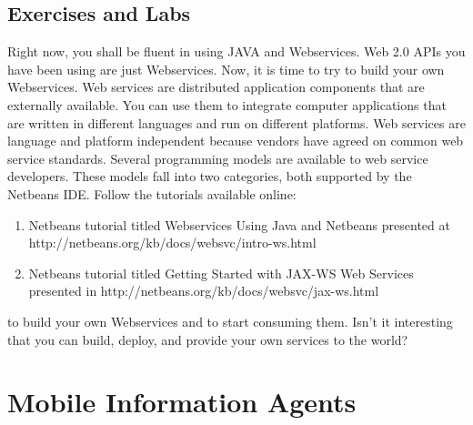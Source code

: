 \documentclass[12pt,a4paper,final,twoside,onecolumn,titlepage]{book}
\begin{document}
\section{Exercises and Labs}
Right now, you shall be fluent in using JAVA and Webservices. Web 2.0 APIs you have been using are just Webservices. Now, it is time to try to build your own Webservices. Web services are distributed application components that are externally available. You can use them to integrate computer applications that are written in different languages and run on different platforms. Web services are language and platform independent because vendors have agreed on common web service standards.
Several programming models are available to web service developers. These models fall into two categories, both supported by the Netbeans IDE. Follow the tutorials available online:
\begin{enumerate}
\item  Netbeans tutorial titled Webservices Using Java and Netbeans presented at http://netbeans.org/kb/docs/websvc/intro-ws.html
\item Netbeans tutorial titled Getting Started with JAX-WS Web Services presented in http://netbeans.org/kb/docs/websvc/jax-ws.html
\end{enumerate}
to build your own Webservices and to start consuming them. Isn't it interesting that you can build, deploy, and provide your own services to the world?

\chapter{Mobile Information Agents}
\label{MobileInformationAgents}
\end{document}
